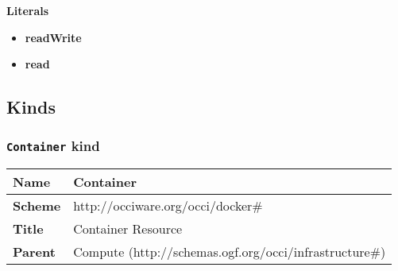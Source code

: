 \textbf{Literals}
\begin{itemize}
\item \textbf{readWrite} 
\end{itemize}
\begin{itemize}
\item \textbf{read} 
\end{itemize}

\subsection{Kinds}
\subsubsection{\texttt{Container} kind}
\begin{center}
\begin{tabular}{|l|l|}
  \hline
  \textbf{Name} & Container \\
  \hline  
  \textbf{Scheme} & http://occiware.org/occi/docker\# \\
  \hline
  \textbf{Title} & Container Resource \\
  \hline
  \textbf{Parent} & Compute (http://schemas.ogf.org/occi/infrastructure\#) \\
  \hline
\end{tabular}
\end{center}
